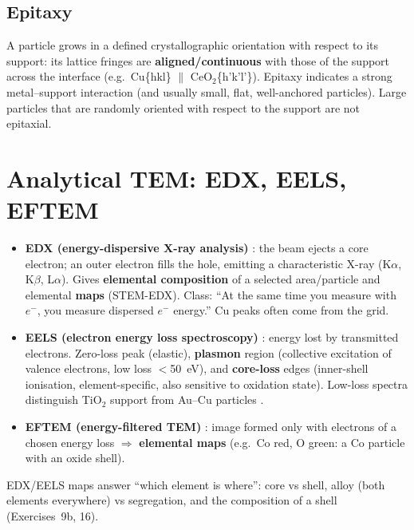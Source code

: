 \subsection*{Epitaxy}
\begin{defbox}
A particle grows in a defined crystallographic orientation with respect to its support: its lattice fringes are
\textbf{aligned/continuous} with those of the support across the interface (e.g.\ Cu\{hkl\} $\parallel$ CeO$_2$\{h'k'l'\}).
Epitaxy indicates a strong metal--support interaction (and usually small, flat, well-anchored particles). Large
particles that are randomly oriented with respect to the support are not epitaxial.\extra
\end{defbox}

\section{Analytical TEM: EDX, EELS, EFTEM}
\begin{itemize}
  \item \textbf{EDX (energy-dispersive X-ray analysis)} : the beam ejects a core electron; an outer electron
        fills the hole, emitting a characteristic X-ray (K$\alpha$, K$\beta$, L$\alpha$). Gives \textbf{elemental composition}
        of a selected area/particle and elemental \textbf{maps} (STEM-EDX). Class: ``At the same time you measure with
        $e^-$, you measure dispersed $e^-$ energy.'' Cu peaks often come from the grid.
  \item \textbf{EELS (electron energy loss spectroscopy)} : energy lost by transmitted electrons. Zero-loss peak
        (elastic), \textbf{plasmon} region (collective excitation of valence electrons, low loss $<$\SI{50}{eV}), and
        \textbf{core-loss} edges (inner-shell ionisation, element-specific, also sensitive to oxidation state).
        Low-loss spectra distinguish TiO$_2$ support from Au--Cu particles .
  \item \textbf{EFTEM (energy-filtered TEM)} : image formed only with electrons of a chosen energy loss
        $\Rightarrow$ \textbf{elemental maps} (e.g.\ Co red, O green: a Co particle with an oxide shell).
\end{itemize}
\begin{tipbox}
EDX/EELS maps answer ``which element is where'': core vs shell, alloy (both elements everywhere) vs segregation, and
the composition of a shell (Exercises~9b, 16).
\end{tipbox}

